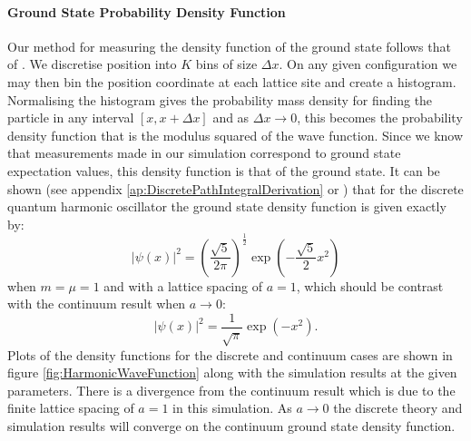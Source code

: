 \documentclass[12pt]{article}
\begin{document}
                

            \paragraph{Ground State Probability Density Function}
            Our method for measuring the density function of the ground state follows that of \cite{creutz_freedman_1981}. We discretise position into $K$ bins of size $\Delta x$. On any given configuration we may then bin the position coordinate at each lattice site and create a histogram. Normalising the histogram gives the probability mass density for finding the particle in any interval $\left[x,x+\Delta x\right]$ and as $\Delta x \rightarrow 0$, this becomes the probability density function that is the modulus squared of the wave function. Since we know that measurements made in our simulation correspond to ground state expectation values, this density function is that of the ground state. It can be shown (see appendix \ref{ap:DiscretePathIntegralDerivation} or \cite{creutz_freedman_1981}) that for the discrete quantum harmonic oscillator the ground state density function is given exactly by:
            \begin{equation}
                \label{eq:magSquaredWavefunction}
                |\psi\left(x\right)|^2=\left(\frac{\sqrt{5}}{2\pi}\right)^\frac{1}{2}\exp\left(-\frac{\sqrt{5}}{2}x^2\right)
            \end{equation}
            when $m=\mu=1$ and with a lattice spacing of $a=1$, which should be contrast with the continuum result when $a\rightarrow 0$:
            \begin{equation}
            |\psi\left(x\right)|^2 = \frac{1}{\sqrt{\pi}}\exp{\left(-x^2\right)}.
            \end{equation}
            Plots of the density functions for the discrete and continuum cases are shown in figure \ref{fig:HarmonicWaveFunction} along with the simulation results at the given parameters. There is a divergence from the continuum result which is due to the finite lattice spacing of $a=1$ in this simulation. As $a\rightarrow 0$ the discrete theory and simulation results will converge on the continuum ground state density function.
\end{document}
